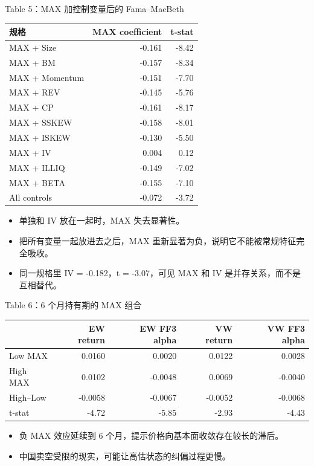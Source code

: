 \documentclass[aspectratio=169,10pt]{beamer}
\newcommand{\tighttable}{\scriptsize\setlength{\tabcolsep}{3pt}\renewcommand{\arraystretch}{1.12}}
\newcommand{\tinytab}{\tiny\setlength{\tabcolsep}{2.2pt}\renewcommand{\arraystretch}{1.08}}
\begin{document}
\begin{frame}{Table 5：MAX 加控制变量后的 Fama--MacBeth}
	\tinytab
	\begin{tabular}{lrr}
		\toprule
		规格 & MAX coefficient & t-stat \\
		\midrule
		MAX + Size & -0.161 & -8.42\\
		MAX + BM & -0.157 & -8.34\\
		MAX + Momentum & -0.151 & -7.70\\
		MAX + REV & -0.145 & -5.76\\
		MAX + CP & -0.161 & -8.17\\
		MAX + SSKEW & -0.158 & -8.01\\
		MAX + ISKEW & -0.130 & -5.50\\
		MAX + IV & 0.004 & 0.12\\
		MAX + ILLIQ & -0.149 & -7.02\\
		MAX + BETA & -0.155 & -7.10\\
		All controls & -0.072 & -3.72\\
		\bottomrule
	\end{tabular}
	\hfill
	\begin{minipage}{0.44\textwidth}
		\small
		\begin{itemize}
			\item 单独和 IV 放在一起时，MAX 失去显著性。
			\item 把所有变量一起放进去之后，MAX 重新显著为负，说明它不能被常规特征完全吸收。
			\item 同一规格里 IV = -0.182，t = -3.07，可见 MAX 和 IV 是并存关系，而不是互相替代。
		\end{itemize}
	\end{minipage}
\end{frame}

\begin{frame}{Table 6：6 个月持有期的 MAX 组合}
	\tighttable
	\begin{tabular}{lrrrr}
		\toprule
		& EW return & EW FF3 alpha & VW return & VW FF3 alpha\\
		\midrule
		Low MAX & 0.0160 & 0.0020 & 0.0122 & 0.0028\\
		High MAX & 0.0102 & -0.0048 & 0.0069 & -0.0040\\
		High--Low & -0.0058 & -0.0067 & -0.0052 & -0.0068\\
		t-stat & -4.72 & -5.85 & -2.93 & -4.43\\
		\bottomrule
	\end{tabular}
	\vspace{6pt}
	\begin{itemize}
		\item 负 MAX 效应延续到 6 个月，提示价格向基本面收敛存在较长的滞后。
		\item 中国卖空受限的现实，可能让高估状态的纠偏过程更慢。
	\end{itemize}
\end{frame}
\end{document}
